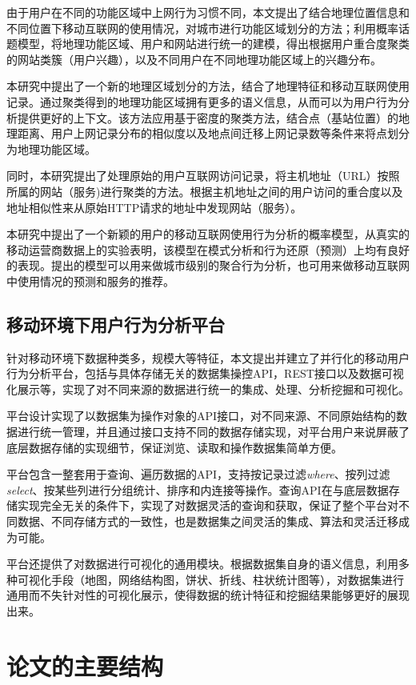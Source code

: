 由于用户在不同的功能区域中上网行为习惯不同，本文提出了结合地理位置信息和不同位置下移动互联网的使用情况，对城市进行功能区域划分的方法；利用概率话题模型，将地理功能区域、用户和网站进行统一的建模，得出根据用户重合度聚类的网站类簇（用户兴趣），以及不同用户在不同地理功能区域上的兴趣分布。

本研究中提出了一个新的地理区域划分的方法，结合了地理特征和移动互联网使用记录。通过聚类得到的地理功能区域拥有更多的语义信息，从而可以为用户行为分析提供更好的上下文。该方法应用基于密度的聚类方法，结合点（基站位置）的地理距离、用户上网记录分布的相似度以及地点间迁移上网记录数等条件来将点划分为地理功能区域。

同时，本研究提出了处理原始的用户互联网访问记录，将主机地址（URL）按照所属的网站（服务)进行聚类的方法。根据主机地址之间的用户访问的重合度以及地址相似性来从原始HTTP请求的地址中发现网站（服务）。

本研究中提出了一个新颖的用户的移动互联网使用行为分析的概率模型，从真实的移动运营商数据上的实验表明，该模型在模式分析和行为还原（预测）上均有良好的表现。提出的模型可以用来做城市级别的聚合行为分析，也可用来做移动互联网中使用情况的预测和服务的推荐。


\subsection{移动环境下用户行为分析平台}
针对移动环境下数据种类多，规模大等特征，本文提出并建立了并行化的移动用户行为分析平台，包括与具体存储无关的数据集操控API，REST接口以及数据可视化展示等，实现了对不同来源的数据进行统一的集成、处理、分析挖掘和可视化。

平台设计实现了以数据集为操作对象的API接口，对不同来源、不同原始结构的数据进行统一管理，并且通过接口支持不同的数据存储实现，对平台用户来说屏蔽了底层数据存储的实现细节，保证浏览、读取和操作数据集简单方便。

平台包含一整套用于查询、遍历数据的API，支持按记录过滤\textit{where}、按列过滤\textit{select}、按某些列进行分组统计、排序和内连接等操作。查询API在与底层数据存储实现完全无关的条件下，实现了对数据灵活的查询和获取，保证了整个平台对不同数据、不同存储方式的一致性，也是数据集之间灵活的集成、算法和灵活迁移成为可能。

平台还提供了对数据进行可视化的通用模块。根据数据集自身的语义信息，利用多种可视化手段（地图，网络结构图，饼状、折线、柱状统计图等），对数据集进行通用而不失针对性的可视化展示，使得数据的统计特征和挖掘结果能够更好的展现出来。

\section{论文的主要结构}

